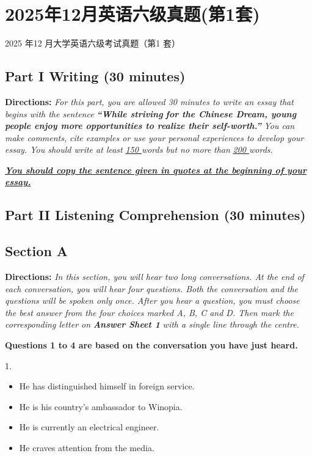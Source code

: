 \documentclass[UTF8,11pt]{ctexart}
\begin{document}
\section*{2025年12月英语六级真题(第1套)}
2025 年12 月大学英语六级考试真题（第1 套）


\subsection*{\textbf{Part I Writing} \textbf{(30 minutes)}}


\textbf{Directions:}\textit{ For this part, you are allowed 30 minutes to write an essay that begins with the sentence }\textbf{\textit{“While striving}} \textbf{\textit{for the Chinese Dream, young people enjoy more opportunities to realize their self-worth.”}}\textit{ You can make comments,} \textit{cite examples or use your personal experiences to develop your essay. You should write at least }\textit{\uline{150 }}\textit{words but no more} \textit{than }\textit{\uline{200 }}\textit{words.}


\textbf{\textit{\uline{You should copy the sentence given in quotes at the beginning of your essay.}}}


\subsection*{\textbf{Part II} \textbf{Listening Comprehension} \textbf{(30 minutes)}}


\subsection*{\textbf{Section A}}


\textbf{Directions:} \textit{In this section, you will hear two long conversations. At the end of each conversation, you will hear four} \textit{questions. Both the conversation and the questions will be spoken only once. After you hear a question, you must choose} \textit{the best answer from the four choices marked A, B, C and D. Then mark the corresponding letter on }\textbf{\textit{Answer Sheet 1}} \textit{with a single line through the centre.}


\textbf{Questions 1 to 4 are based on the conversation you have just heard.}


1.


\begin{itemize}[leftmargin=2em,itemsep=.2em,topsep=.4em]\item[A.] He has distinguished himself in foreign service.
\item[B.] He is his country’s ambassador to Winopia.
\item[C.] He is currently an electrical engineer.
\item[D.] He craves attention from the media.
\end{itemize}
\end{document}
